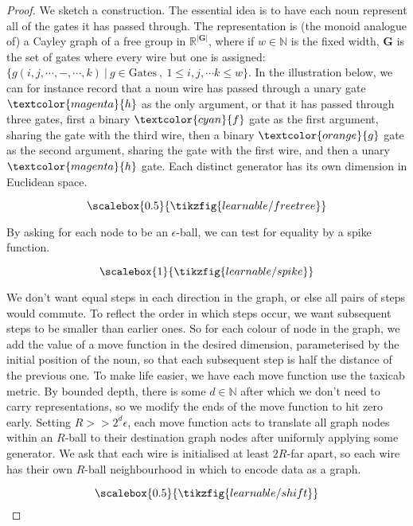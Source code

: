 \begin{fullwidth}
\begin{theorem}
\begin{proof}

We sketch a construction. The essential idea is to have each noun represent all of the gates it has passed through. The representation is (the monoid analogue of) a Cayley graph of a free group in $\mathbb{R}^{|\mathbf{G}|}$, where if $w \in \mathbb{N}$ is the fixed width, $\mathbf{G}$ is the set of gates where every wire but one is assigned: $\{ g(i,j,\cdots,-,\cdots,k) \ | \ g \in \text{Gates} \ , \ 1 \leq i,j,\cdots k \leq w\}$. In the illustration below, we can for instance record that a noun wire has passed through a unary gate $\textcolor{magenta}{h}$ as the only argument, or that it has passed through three gates, first a binary $\textcolor{cyan}{f}$ gate as the first argument, sharing the gate with the third wire, then a binary $\textcolor{orange}{g}$ gate as the second argument, sharing the gate with the first wire, and then a unary $\textcolor{magenta}{h}$ gate. Each distinct generator has its own dimension in Euclidean space.

\[\scalebox{0.5}{\tikzfig{learnable/freetree}}\]

By asking for each node to be an $\epsilon$-ball, we can test for equality by a spike function.

\[\scalebox{1}{\tikzfig{learnable/spike}}\]

We don't want equal steps in each direction in the graph, or else all pairs of steps would commute. To reflect the order in which steps occur, we want subsequent steps to be smaller than earlier ones. So for each colour of node in the graph, we add the value of a move function in the desired dimension, parameterised by the initial position of the noun, so that each subsequent step is half the distance of the previous one. To make life easier, we have each move function use the taxicab metric. By bounded depth, there is some $d \in \mathbb{N}$ after which we don't need to carry representations, so we modify the ends of the move function to hit zero early. Setting $R >> 2^d \epsilon$, each move function acts to translate all graph nodes within an $R$-ball to their destination graph nodes after uniformly applying some generator. We ask that each wire is initialised at least $2R$-far apart, so each wire has their own $R$-ball neighbourhood in which to encode data as a graph. 

\[\scalebox{0.5}{\tikzfig{learnable/shift}}\]


\end{proof}
\end{theorem}
\end{fullwidth}
